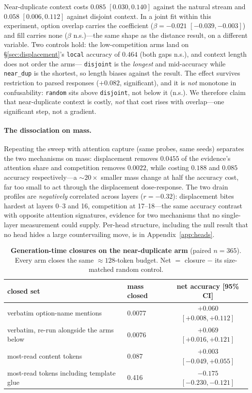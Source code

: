 \documentclass{article}
\begin{document}
Near-duplicate context costs $0.085$ $[0.030,0.140]$ against the natural stream and $0.058$
$[0.006,0.112]$ against disjoint context. In a joint fit within this experiment, option
overlap carries the coefficient ($\beta=-0.021$ $[-0.039,-0.003]$) and fill carries
none ($\beta$ n.s.)---the same shape as the distance result, on a different variable. Two
controls hold: the low-competition arms land on \S\ref{sec:displacement}'s \texttt{local}
accuracy of $0.464$ (both gaps n.s.), and context length does not order the arms---
\texttt{disjoint} is the \emph{longest} and mid-accuracy while \texttt{near\_dup} is the
shortest, so length biases against the result. The effect survives restriction to parsed
responses ($+0.082$, significant), and it is \emph{not} monotone in confusability:
\texttt{random} sits above \texttt{disjoint}, not below it (n.s.). We therefore claim that
near-duplicate context is costly, \emph{not} that cost rises with overlap---one significant
step, not a gradient.

\paragraph{The dissociation on mass.}
Repeating the sweep with attention capture (same probes, same seeds) separates the two
mechanisms on mass: displacement removes $0.0455$ of the evidence's attention share and
competition removes $0.0022$, while costing $0.188$ and $0.085$ accuracy respectively---a
${\sim}20\times$ smaller mass change at half the accuracy cost, far too small to act through
the displacement dose-response. The two drain profiles are \emph{negatively} correlated across layers
($r{=}-0.32$): displacement bites hardest at layers 0--3 and 16, competition at 17--18---the
same accuracy contrast with opposite attention signatures, evidence for two mechanisms that no
single-layer measurement could supply. Per-head structure, including the null result that no
head hides a large countervailing move, is in Appendix~\ref{app:heads}.

\begin{table}[t]
  \centering\small
  \caption{\textbf{Generation-time closures on the near-duplicate arm} (paired $n{=}365$).
  Every arm closes the same ${\approx}128$-token budget. Net $=$ closure $-$ its size-matched
  random control.}
  \label{tab:closures}
  \setlength{\tabcolsep}{5pt}
  \begin{tabular}{llc}
    \toprule
    closed set & mass closed & net accuracy [95\% CI]\\
    \midrule
    verbatim option-name mentions & 0.0077 & $+0.060$ $[+0.008,+0.112]$\\
    verbatim, re-run alongside the arms below & 0.0076 & $+0.069$ $[+0.016,+0.121]$\\
    most-read content tokens & 0.087 & $+0.003$ $[-0.049,+0.055]$\\
    most-read tokens including template glue & 0.416 & $-0.175$ $[-0.230,-0.121]$\\
    \bottomrule
  \end{tabular}
\end{table}
\end{document}
